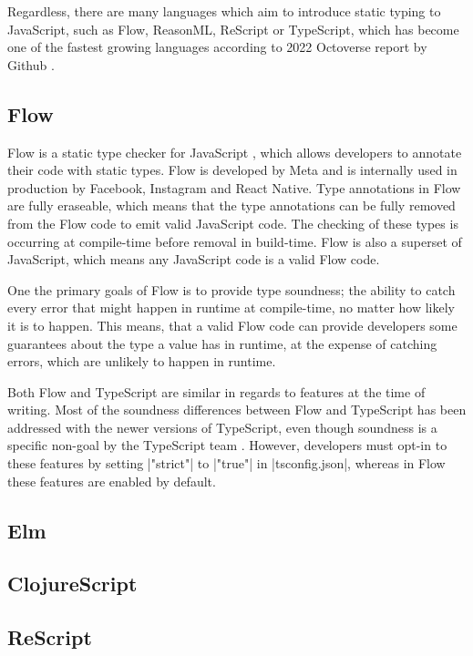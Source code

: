 Regardless, there are many languages which aim to introduce static typing to JavaScript, such as Flow, ReasonML, ReScript or TypeScript, which has become one of the fastest growing languages according to 2022 Octoverse report by Github \cite{Octoverse2022State}.

\subsection{Flow}

Flow is a static type checker for JavaScript \cite{chaudhuriFastPreciseType2017,Flow2023}, which allows developers to annotate their code with static types. Flow is developed by Meta and is internally used in production by Facebook, Instagram and React Native. Type annotations in Flow are fully eraseable, which means that the type annotations can be fully removed from the Flow code to emit valid JavaScript code. The checking of these types is occurring at compile-time before removal in build-time. Flow is also a superset of JavaScript, which means any JavaScript code is a valid Flow code.

One the primary goals of Flow is to provide type soundness; the ability to catch every error that might happen in runtime at compile-time, no matter how likely it is to happen. This means, that a valid Flow code can provide developers some guarantees about the type a value has in runtime, at the expense of catching errors, which are unlikely to happen in runtime.

Both Flow and TypeScript are similar in regards to features at the time of writing. Most of the soundness differences between Flow and TypeScript has been addressed with the newer versions of TypeScript, even though soundness is a specific non-goal by the TypeScript team \cite{TypeScriptDesignGoals}. However, developers must opt-in to these features by setting \codeword|"strict"| to \codeword|"true"| in \codeword|tsconfig.json|, whereas in Flow these features are enabled by default.

\subsection{Elm}

\subsection{ClojureScript}

\subsection{ReScript}

